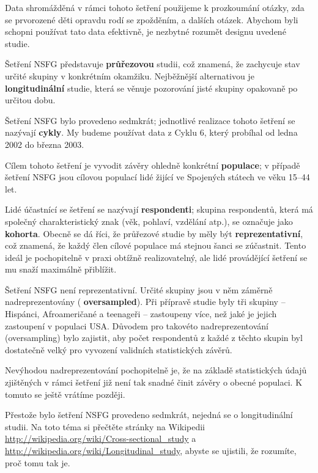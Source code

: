 \documentclass[12pt]{book}
\begin{document}
Data shromážděná v rámci tohoto šetření použijeme k prozkoumání otázky, zda se prvorozené děti opravdu rodí se zpožděním, a dalších otázek. Abychom byli schopni používat tato data efektivně, je nezbytné rozumět designu uvedené studie.

Šetření NSFG představuje {\bf průřezovou} studii, což znamená, že zachycuje stav určité skupiny v konkrétním okamžiku. Nejběžnější alternativou je {\bf longitudinální} studie, která se věnuje pozorování jisté skupiny opakovaně po určitou dobu.

Šetření NSFG bylo provedeno sedmkrát; jednotlivé realizace tohoto šetření se nazývají {\bf cykly}.  My budeme používat data z Cyklu 6, který probíhal od ledna 2002 do března 2003.

Cílem tohoto šetření je vyvodit závěry ohledně konkrétní {\bf populace}; v případě šetření NSFG jsou cílovou populací lidé žijící ve Spojených státech ve věku 15--44 let.

Lidé účastnící se šetření se nazývají {\bf respondenti};
skupina respondentů, která má společný charakteristický znak (věk, pohlaví, vzdělání atp.), se označuje jako {\bf kohorta}.
Obecně se dá říci, že průřezové studie by měly být {\bf
 reprezentativní}, což znamená, že každý člen cílové populace má stejnou šanci se zúčastnit. Tento ideál je pochopitelně v praxi obtížně realizovatelný, ale lidé provádějící šetření se mu snaží maximálně přiblížit.

Šetření NSFG není reprezentativní. Určité skupiny jsou v něm záměrně nadreprezentovány ({\bf
oversampled}).  Při přípravě studie byly tři skupiny -- Hispánci, Afroameričané a teenageři -- zastoupeny více, než jaké je jejich zastoupení v populaci USA.
Důvodem pro takovéto nadreprezentování (oversampling) bylo zajistit, aby počet respondentů z každé z těchto skupin byl dostatečně velký pro vyvození validních statistických závěrů.

Nevýhodou nadreprezentování pochopitelně je, že na základě statistických údajů zjištěných v rámci šetření již není tak snadné činit závěry o obecné populaci. K tomuto se ještě vrátíme později.

\begin{exercise}

Přestože bylo šetření NSFG provedeno sedmkrát, nejedná se o longitudinální studii. Na toto téma si přečtěte stránky na Wikipedii
\url{http://wikipedia.org/wiki/Cross-sectional_study}
a
\url{http://wikipedia.org/wiki/Longitudinal_study}, abyste se ujistili, že rozumíte, proč tomu tak je.

\end{exercise}
\end{document}

